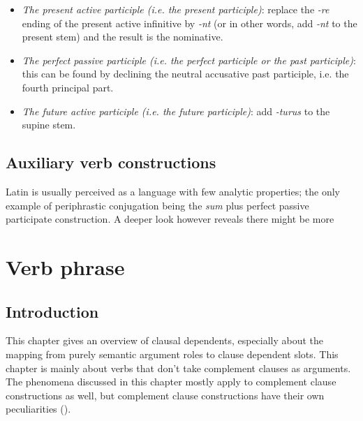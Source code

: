 \documentclass[a4paper, oneside]{report}
\newcommand{\form}[1]{\emph{#1}}
\begin{document}
\begin{itemize}
    \item \emph{The present active participle (i.e. the present participle)}: 
    replace the \form{-re} ending of the present active infinitive by \form{-nt}
    (or in other words, add \form{-nt} to the present stem)
    and the result is the nominative. %
    \item \emph{The perfect passive participle (i.e. the perfect participle or the past participle)}:
    this can be found by declining the neutral accusative past participle, 
    i.e. the fourth principal part.
    \item \emph{The future active participle (i.e. the future participle)}:
     add \form{-turus} to the supine stem.
\end{itemize}


\section{Auxiliary verb constructions}

Latin is usually perceived as a language with few analytic properties;
the only example of periphrastic conjugation 
being the \form{sum} plus perfect passive participate construction.
A deeper look however reveals 
there might be more 

\chapter{Verb phrase}

\section{Introduction}\label{sec:core-argument-marking}

This chapter gives an overview of clausal dependents,
especially about the mapping from purely semantic argument roles to clause dependent slots.
This chapter is mainly about verbs that don't take complement clauses as arguments.
The phenomena discussed in this chapter mostly apply to complement clause constructions as well,
but complement clause constructions have their own peculiarities 
().
\end{document}
